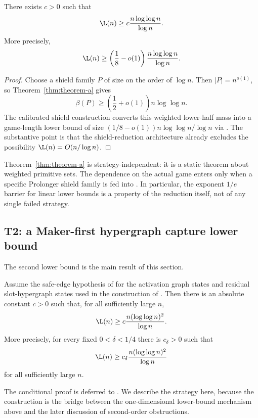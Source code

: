 \begin{corollary}[T1]\label{cor:t1}
There exists $c>0$ such that
\[
  \L(n) \ge c \frac{n\log\log n}{\log n}.
\]
More precisely,
\[
  \L(n) \ge \left(\frac18-o(1)\right)\frac{n\log\log n}{\log n}.
\]
\end{corollary}

\begin{proof}
Choose a shield family $P$ of size on the order of $\log n$.  Then
$|P|=n^{o(1)}$, so Theorem~\ref{thm:theorem-a} gives
\[
  \beta(P) \ge \left(\frac12+o(1)\right)n\log\log n.
\]
The calibrated shield construction converts this weighted lower-half mass into
a game-length lower bound of size
$(1/8-o(1))n\log\log n/\log n$ via .  The
substantive point is that the shield-reduction architecture already excludes the
possibility $\L(n)=O(n/\log n)$.
\end{proof}

\begin{remark}
Theorem~\ref{thm:theorem-a} is strategy-independent: it is a static theorem
about weighted primitive sets.  The dependence on the actual game enters only
when a specific Prolonger shield family is fed into
.  In particular, the exponent $1/e$ barrier for
linear lower bounds is a property of the reduction itself, not of any single
failed strategy.
\end{remark}

\subsection{T2: a Maker-first hypergraph capture lower bound}

The second lower bound is the main result of this section.

\begin{theorem}[Conditional T2]\label{thm:t2}
Assume the safe-edge hypothesis of  for the
activation graph states and residual slot-hypergraph states used in the
construction of .  Then there is an absolute constant
$c>0$ such that, for all sufficiently large $n$,
\[
  \L(n) \ge c\frac{n(\log\log n)^2}{\log n}.
\]
More precisely, for every fixed $0<\delta<1/4$ there is
$c_\delta>0$ such that
\[
  \L(n) \ge c_\delta\frac{n(\log\log n)^2}{\log n}
\]
for all sufficiently large $n$.
\end{theorem}

The conditional proof is deferred to .  We describe the
strategy here, because the construction is the bridge between the
one-dimensional lower-bound mechanism above and the later discussion of
second-order obstructions.

